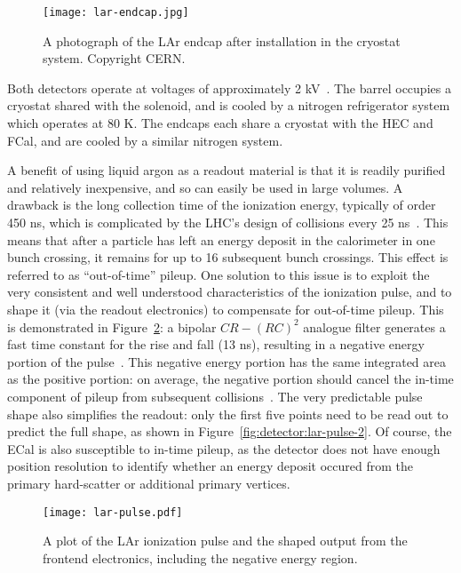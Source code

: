 
\begin{figure}
\centering
\texttt{[image: lar-endcap.jpg]}
\label{fig:detector:lar-endcap}
\caption{A photograph of the LAr endcap after installation in the cryostat system. Copyright CERN.}
\end{figure}


Both detectors operate at voltages of approximately 2 kV~\cite{ATLASPaper}. The barrel occupies a cryostat shared with the solenoid, and is cooled by a nitrogen refrigerator system which operates at 80 K. The endcaps each share a cryostat with the HEC and FCal, and are cooled by a similar nitrogen system.

A benefit of using liquid argon as a readout material is that it is readily purified and relatively inexpensive, and so can easily be used in large volumes. A drawback is the long collection time of the ionization energy, typically of order 450 ns, which is complicated by the LHC's design of collisions every 25 ns~\cite{ATLASPaper,LARPaper}. This means that after a particle has left an energy deposit in the calorimeter in one bunch crossing, it remains for up to 16 subsequent bunch crossings. This effect is referred to as ``out-of-time'' pileup. One solution to this issue is to exploit the very consistent and well understood characteristics of the ionization pulse, and to shape it (via the readout electronics) to compensate for out-of-time pileup. This is demonstrated in Figure~\ref{fig:detector:lar-pulse}: a bipolar $CR -(RC)^2$ analogue filter generates a fast time constant for the rise and fall (13 ns), resulting in a negative energy portion of the pulse~\cite{LARPaper}. This negative energy portion has the same integrated area as the positive portion: on average, the negative portion should cancel the in-time component of pileup from subsequent collisions~\cite{Loch}. The very predictable pulse shape also simplifies the readout: only the first five points need to be read out to predict the full shape, as shown in Figure~\ref{fig:detector:lar-pulse-2}. Of course, the ECal is also susceptible to in-time pileup, as the detector does not have enough position resolution to identify whether an energy deposit occured from the primary hard-scatter or additional primary vertices.


\begin{figure}
\centering
\texttt{[image: lar-pulse.pdf]}
\label{fig:detector:lar-pulse}
\caption{A plot of the LAr ionization pulse and the shaped output from the frontend electronics, including the negative energy region.}
\end{figure}

